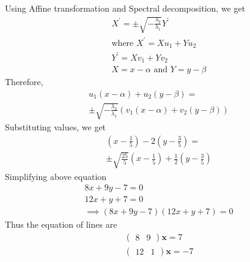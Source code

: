 \documentclass[journal,12pt,twocolumn]{IEEEtran}
\let\vec\mathbf
\numberwithin{equation}{subsection}
\newcommand{\myvec}[1]{\ensuremath{\begin{pmatrix}#1\end{pmatrix}}}
\begin{document}
Using Affine transformation and Spectral decomposition, we get
\begin{align}
X^\prime = \pm \sqrt{-\frac{\lambda_2}{\lambda_1}}Y^\prime\\
\text{where } X^\prime = Xu_1 + Yu_2 \\
Y^\prime = Xv_1 + Yv_2\\
X = x-\alpha \text{ and } Y = y - \beta
\end{align}
Therefore, 
\begin{multline}
	u_1(x-\alpha) + u_2(y-\beta) = \\ \pm \sqrt{-\frac{\lambda_2}{\lambda_1}}(v_1(x-\alpha) + v_2(y-\beta))  \label{2.57}
\end{multline}
Substituting values, we get 
\begin{multline}
	(x-\frac{1}{5})-2(y-\frac{3}{5}) = \\ \pm \sqrt{\frac{25}{5}}(x-\frac{1}{5})+\frac{1}{2}(y-\frac{3}{5}) 
\end{multline}
Simplifying above equation
\begin{align}
	8x+ 9y - 7 = 0 \\
	12x + y + 7 = 0\\
	\implies (8x+ 9y - 7 )(12x + y + 7) = 0
\end{align}
Thus the equation of lines are
\begin{align}
	\myvec{8 & 9}\vec{x} = 7 \\
	\myvec{12 & 1}\vec{x} = -7 
\end{align}
\end{document}
